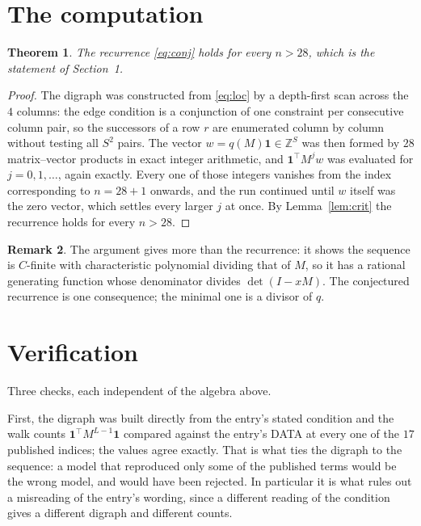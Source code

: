 \documentclass[11pt,a4paper]{article}
\theoremstyle{plain}
\newtheorem{theorem}{Theorem}
\theoremstyle{definition}
\newtheorem{remark}[theorem]{Remark}
\begin{document}
\section{The computation}

\begin{theorem}
The recurrence \eqref{eq:conj} holds for every $n>28$, which is the statement of
Section~1.
\end{theorem}

\begin{proof}
The digraph was constructed from \eqref{eq:loc} by a depth-first scan across the $4$
columns: the edge condition is a conjunction of one constraint per consecutive column
pair, so the successors of a row $r$ are enumerated column by column without testing all
$S^2$ pairs. The vector $w=q(M)\mathbf{1}\in\mathbb{Z}^{S}$ was then formed by $28$
matrix--vector products in exact integer arithmetic, and $\mathbf{1}^{\!\top}M^{j}w$ was
evaluated for $j=0,1,\dots$, again exactly. Every one of those integers vanishes from the
index corresponding to $n=28+1$ onwards, and the run continued until $w$ itself was the
zero vector, which settles every larger $j$ at once. By Lemma~\ref{lem:crit} the recurrence
holds for every $n>28$.
\end{proof}

\begin{remark}
The argument gives more than the recurrence: it shows the sequence is $C$-finite with
characteristic polynomial dividing that of $M$, so it has a rational generating function
whose denominator divides $\det(I-xM)$. The conjectured recurrence is one consequence; the
minimal one is a divisor of $q$.
\end{remark}

\section{Verification}

Three checks, each independent of the algebra above.

First, the digraph was built directly from the entry's stated condition and the walk counts
$\mathbf{1}^{\!\top}M^{L-1}\mathbf{1}$ compared against the entry's DATA at
every one of the $17$ published indices; the values agree exactly. That is what ties
the digraph to the sequence: a model that reproduced only some of the published terms would
be the wrong model, and would have been rejected. In particular it is what rules out a
misreading of the entry's wording, since a different reading of the condition gives a
different digraph and different counts.
\end{document}
